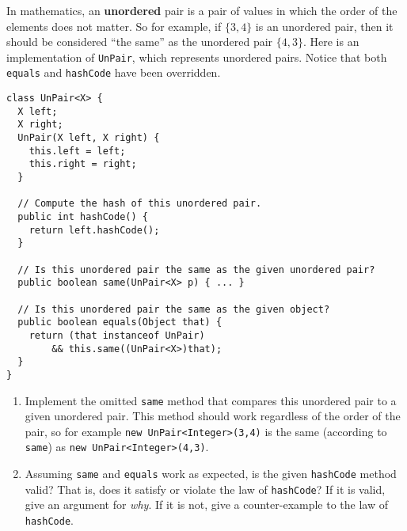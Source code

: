 \documentclass[12pt]{article}                   %
\def\pts#1{\marginpar{\footnotesize \raggedright  \fbox{#1 {\sc Points}}}}
\begin{document}
\begin{problem} \pts{15}

In mathematics, an {\bf unordered} pair is a pair of values in which
the order of the elements does not matter.  So for example, if
$\{3,4\}$ is an unordered pair, then it should be considered ``the
same'' as the unordered pair $\{4,3\}$.  Here is an implementation of
{\tt UnPair}, which represents unordered pairs.  Notice that both {\tt
  equals} and {\tt hashCode} have been overridden.

\begin{verbatim}
class UnPair<X> {
  X left;
  X right;
  UnPair(X left, X right) {
    this.left = left;
    this.right = right;
  }

  // Compute the hash of this unordered pair.
  public int hashCode() {
    return left.hashCode();
  }

  // Is this unordered pair the same as the given unordered pair?
  public boolean same(UnPair<X> p) { ... }

  // Is this unordered pair the same as the given object?
  public boolean equals(Object that) {
    return (that instanceof UnPair)
        && this.same((UnPair<X>)that);
  }
}
\end{verbatim}

\newpage
\begin{enumerate}
\item Implement the omitted {\tt same} method that compares this
  unordered pair to a given unordered pair.  This method should work
  regardless of the order of the pair, so for example {\tt new
    UnPair<Integer>(3,4)} is the same (according to {\tt same}) as
  {\tt new UnPair<Integer>(4,3)}.

\newpage
\item Assuming {\tt same} and {\tt equals} work as expected, is
the given {\tt hashCode} method valid?  That is, does it satisfy or
violate the law of {\tt hashCode}?  If it is valid, give an argument
for \emph{why}.  If it is not, give a counter-example to the law of
{\tt hashCode}.
\end{enumerate}
\end{problem}
\newpage
\end{document}
